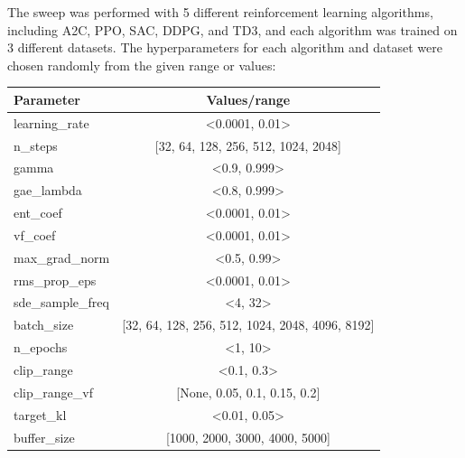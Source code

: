 \documentclass[../xlapes02]{subfiles}
\begin{document}
    The sweep was performed with 5 different reinforcement learning algorithms, including A2C, PPO, SAC, DDPG, and TD3, and each algorithm was trained on 3 different datasets. The hyperparameters for each algorithm and dataset were chosen randomly from the given range or values:
    \begin{center}
        \begin{tabular}{|l|c|}
            \hline
            \textbf{Parameter}        & \textbf{Values/range}                           \\ \hline
            learning\_rate            & <0.0001, 0.01>                                  \\ \hline
            n\_steps                  & [32, 64, 128, 256, 512, 1024, 2048]             \\ \hline
            gamma                     & <0.9, 0.999>                                    \\ \hline
            gae\_lambda               & <0.8, 0.999>                                    \\ \hline
            ent\_coef                 & <0.0001, 0.01>                                  \\ \hline
            vf\_coef                  & <0.0001, 0.01>                                  \\ \hline
            max\_grad\_norm           & <0.5, 0.99>                                     \\ \hline
            rms\_prop\_eps            & <0.0001, 0.01>                                  \\ \hline
            sde\_sample\_freq         & <4, 32>                                         \\ \hline
            batch\_size               & [32, 64, 128, 256, 512, 1024, 2048, 4096, 8192] \\ \hline
            n\_epochs                 & <1, 10>                                         \\ \hline
            clip\_range               & <0.1, 0.3>                                      \\ \hline
            clip\_range\_vf           & [None, 0.05, 0.1, 0.15, 0.2]                    \\ \hline
            target\_kl                & <0.01, 0.05>                                    \\ \hline
            buffer\_size              & [1000, 2000, 3000, 4000, 5000]                  \\ \hline

\end{tabular}
\end{center}
\end{document}
